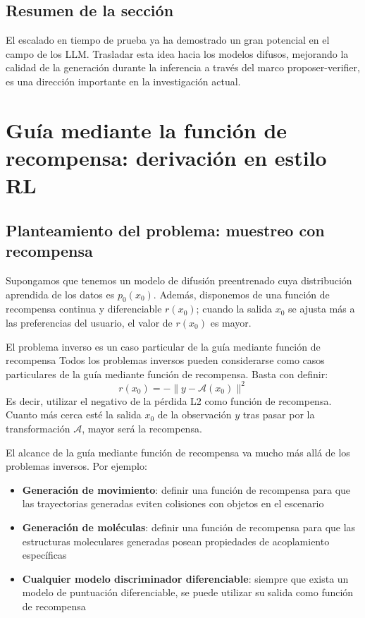 \documentclass[a4paper]{article}
\begin{document}
\subsection{Resumen de la sección}

El escalado en tiempo de prueba ya ha demostrado un gran potencial en el campo de los LLM. Trasladar esta idea hacia los modelos difusos, mejorando la calidad de la generación durante la inferencia a través del marco proposer-verifier, es una dirección importante en la investigación actual.


\section{Guía mediante la función de recompensa: derivación en estilo RL}

\subsection{Planteamiento del problema: muestreo con recompensa}

Supongamos que tenemos un modelo de difusión preentrenado cuya distribución aprendida de los datos es $p_0(x_0)$. Además, disponemos de una función de recompensa continua y diferenciable $r(x_0)$; cuando la salida $x_0$ se ajusta más a las preferencias del usuario, el valor de $r(x_0)$ es mayor.

\begin{importantbox}{El problema inverso es un caso particular de la guía mediante función de recompensa}
Todos los problemas inversos pueden considerarse como casos particulares de la guía mediante función de recompensa. Basta con definir:
$$r(x_0) = -\| y - \mathcal{A}(x_0) \|^2$$
Es decir, utilizar el negativo de la pérdida L2 como función de recompensa. Cuanto más cerca esté la salida $x_0$ de la observación $y$ tras pasar por la transformación $\mathcal{A}$, mayor será la recompensa.
\end{importantbox}

El alcance de la guía mediante función de recompensa va mucho más allá de los problemas inversos. Por ejemplo:

\begin{itemize}
    \item \textbf{Generación de movimiento}: definir una función de recompensa para que las trayectorias generadas eviten colisiones con objetos en el escenario
    \item \textbf{Generación de moléculas}: definir una función de recompensa para que las estructuras moleculares generadas posean propiedades de acoplamiento específicas
    \item \textbf{Cualquier modelo discriminador diferenciable}: siempre que exista un modelo de puntuación diferenciable, se puede utilizar su salida como función de recompensa
\end{itemize}
\end{document}
